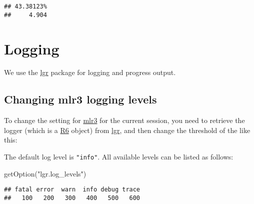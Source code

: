 \documentclass[
]{scrbook}
\newenvironment{Shaded}{\begin{snugshade}}{\end{snugshade}}
\newcommand{\FunctionTok}[1]{\textcolor[rgb]{0.00,0.00,0.00}{#1}}
\newcommand{\NormalTok}[1]{#1}
\newcommand{\OtherTok}[1]{\textcolor[rgb]{0.56,0.35,0.01}{#1}}
\newcommand{\SpecialCharTok}[1]{\textcolor[rgb]{0.00,0.00,0.00}{#1}}
\newcommand{\StringTok}[1]{\textcolor[rgb]{0.31,0.60,0.02}{#1}}
\renewenvironment{Shaded} {\begin{snugshade}\small} {\end{snugshade}}
\begin{document}
\begin{verbatim}
## 43.38123% 
##     4.904
\end{verbatim}

\hypertarget{logging}{%
\section{Logging}\label{logging}}

We use the \href{https://cran.r-project.org/package=lgr}{lgr} package for logging and progress output.

\hypertarget{changing-mlr3-logging-levels}{%
\subsection{Changing mlr3 logging levels}\label{changing-mlr3-logging-levels}}

To change the setting for \href{https://mlr3.mlr-org.com}{mlr3} for the current session, you need to retrieve the logger (which is a \href{https://cran.r-project.org/package=R6}{R6} object) from \href{https://cran.r-project.org/package=lgr}{lgr}, and then change the threshold of the like this:

\begin{Shaded}
\end{Shaded}

The default log level is \texttt{"info"}.
All available levels can be listed as follows:

\begin{Shaded}
\begin{Highlighting}[]
\FunctionTok{getOption}\NormalTok{(}\StringTok{"lgr.log\_levels"}\NormalTok{)}
\end{Highlighting}
\end{Shaded}

\begin{verbatim}
## fatal error  warn  info debug trace 
##   100   200   300   400   500   600
\end{verbatim}
\end{document}
